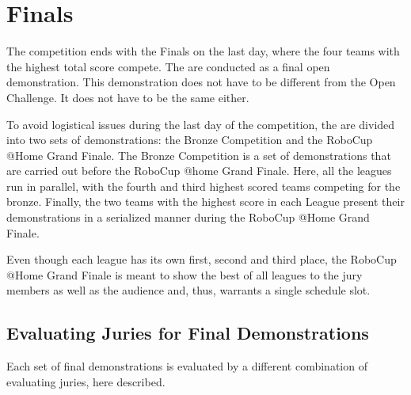\chapter{Finals}

The competition ends with the Finals on the last day, where the four teams with the highest total score compete.
The  are conducted as a final open demonstration.
This demonstration does not have to be different from the Open Challenge. 
It does not have to be the same either.

To avoid logistical issues during the last day of the competition, the  are divided into two sets of demonstrations: the Bronze Competition and the RoboCup @Home Grand Finale.
The Bronze Competition is a set of demonstrations that are carried out before the RoboCup @home Grand Finale. Here, all the leagues run in parallel, with the fourth and third highest scored teams competing for the bronze.
Finally, the two teams with the highest score in each League present their demonstrations in a serialized manner during the RoboCup @Home Grand Finale.

Even though each league has its own first, second and third place, the RoboCup @Home Grand Finale is meant to show the best of all leagues to the jury members as well as the audience and, thus, warrants a single schedule slot.

\section{Evaluating Juries for Final Demonstrations}
\label{final:jury}
Each set of final demonstrations is evaluated by a different combination of evaluating juries, here described.

